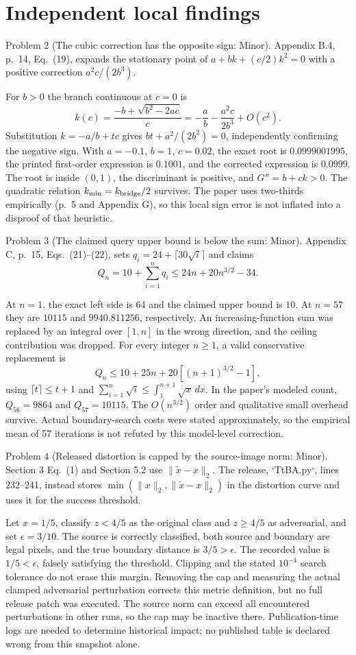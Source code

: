 \documentclass[10pt]{article}
\begin{document}
\section*{Independent local findings}
Problem 2 (The cubic correction has the opposite sign: Minor).  Appendix B.4, p. 14, Eq. (19), expands the stationary point of \(a+bk+(c/2)k^2=0\) with a positive correction \(a^2c/(2b^3)\).\par
For \(b>0\) the branch continuous at \(c=0\) is \[k(c)=\frac{-b+\sqrt{b^2-2ac}}{c}
=-\frac ab-\frac{a^2c}{2b^3}+O(c^2).\] Substitution \(k=-a/b+tc\) gives \(bt+a^2/(2b^2)=0\), independently confirming the negative sign. With \(a=-0.1\), \(b=1\), \(c=0.02\), the exact root is \(0.0999001995\), the printed first-order expression is \(0.1001\), and the corrected expression is \(0.0999\). The root is inside \((0,1)\), the discriminant is positive, and \(G''=b+ck>0\). The quadratic relation \(k_{\min}=k_{\rm bridge}/2\) survives. The paper uses two-thirds empirically (p. 5 and Appendix G), so this local sign error is not inflated into a disproof of that heuristic.\par
Problem 3 (The claimed query upper bound is below the sum: Minor).  Appendix C, p. 15, Eqs. (21)–(22), sets \(q_i=24+\lceil30\sqrt i\rceil\) and claims \[Q_n=10+\sum_{i=1}^{n}q_i\leq24n+20n^{3/2}-34.\]\par
At \(n=1\), the exact left side is \(64\) and the claimed upper bound is \(10\). At \(n=57\) they are \(10115\) and \(9940.811256\), respectively. An increasing-function sum was replaced by an integral over \([1,n]\) in the wrong direction, and the ceiling contribution was dropped. For every integer \(n\geq1\), a valid conservative replacement is \[Q_n\leq10+25n+20[(n+1)^{3/2}-1],\] using \(\lceil t\rceil\leq t+1\) and \(\sum_{i=1}^n\sqrt i\leq\int_1^{n+1}\sqrt x\,dx\). In the paper’s modeled count, \(Q_{56}=9864\) and \(Q_{57}=10115\). The \(O(n^{3/2})\) order and qualitative small overhead survive. Actual boundary-search costs were stated approximately, so the empirical mean of 57 iterations is not refuted by this model-level correction.\par
Problem 4 (Released distortion is capped by the source-image norm: Minor).  Section 3 Eq. (1) and Section 5.2 use \(\|\tilde x-x\|_2\). The release, `TtBA.py`, lines 232–241, instead stores \(\min(\|x\|_2,\|\tilde x-x\|_2)\) in the distortion curve and uses it for the success threshold.\par
Let \(x=1/5\), classify \(z<4/5\) as the original class and \(z\geq4/5\) as adversarial, and set \(\epsilon=3/10\). The source is correctly classified, both source and boundary are legal pixels, and the true boundary distance is \(3/5>\epsilon\). The recorded value is \(1/5<\epsilon\), falsely satisfying the threshold. Clipping and the stated \(10^{-4}\) search tolerance do not erase this margin. Removing the cap and measuring the actual clamped adversarial perturbation corrects this metric definition, but no full release patch was executed. The source norm can exceed all encountered perturbations in other runs, so the cap may be inactive there. Publication-time logs are needed to determine historical impact; no published table is declared wrong from this snapshot alone.\par
\end{document}
